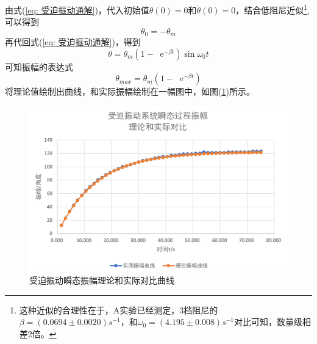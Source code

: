 \documentclass[a4paper,11pt]{article}
\newcommand*{\e}{\mathop{}\!\mathrm{e}}
\begin{document}
        由式(\ref{eq: 受迫振动通解})，代入初始值$\theta(0) = 0$和$\dot{\theta}(0) = 0$，结合低阻尼近似\footnote{这种近似的合理性在于，A实验已经测定，3档阻尼的$\beta = (0.0694 \pm 0.0020)s^{-1} $，和$\omega_0 = (4.195 \pm 0.008)s^{-1}$对比可知，数量级相差2倍。},可以得到
        \begin{equation}
            \theta_0 = -\theta_m
        \end{equation}
        再代回式(\ref{eq: 受迫振动通解})，得到
        \begin{equation}
            \theta = \theta_m(1-\e^{-\beta t})\sin\omega_0t
        \end{equation}
        可知振幅的表达式
        \begin{equation}
            \theta_{max} = \theta_m(1-\e^{-\beta t})
        \end{equation}
        将理论值绘制出曲线，和实际振幅绘制在一幅图中，如图(\ref{fig: 受迫理论和实际})所示。
        
        \begin{figure}[ht]
            \centering
            \includegraphics[scale=0.7]{受迫振动瞬态振幅理论和实际对比曲线.png}
            \caption{受迫振动瞬态振幅理论和实际对比曲线}
            \label{fig: 受迫理论和实际}
        \end{figure}
\end{document}
